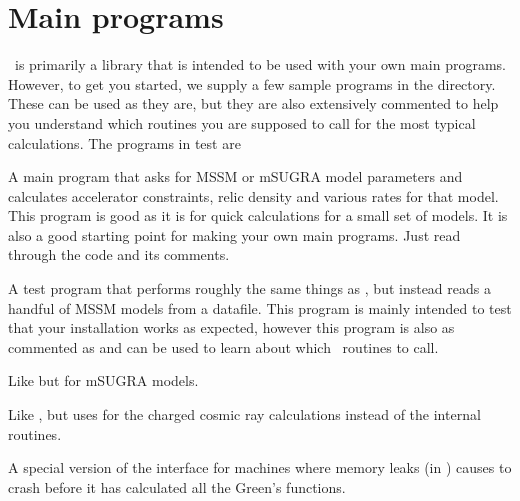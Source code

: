 \chapter{Main programs}

\ds\ is primarily a library that is intended to be used with your own main programs. However, to get you started, we supply a few sample programs in the  directory. These can be used as they are, but they are also extensively commented to help you understand which routines you are supposed to call for the most typical calculations. The programs in test are

\begin{description}

\item{} A main program that asks for MSSM or mSUGRA model parameters and calculates accelerator constraints, relic density and various rates for that model. This program is good as it is for quick calculations for a small set of models. It is also a good starting point for making your own main programs. Just read through the code and its comments.

\item{} A test program that performs roughly the same things as , but instead reads a handful of MSSM models from a datafile. This program is mainly intended to test that your installation works as expected, however this program is also as commented as  and can be used to learn about which \ds\ routines to call.

\item{} Like  but for mSUGRA models.

\item{} Like , but uses  for the charged cosmic ray calculations instead of the internal routines.

\item{} A special version of the  interface for machines where memory leaks (in ) causes  to crash before it has calculated all the Green's functions.

\end{description}
 

